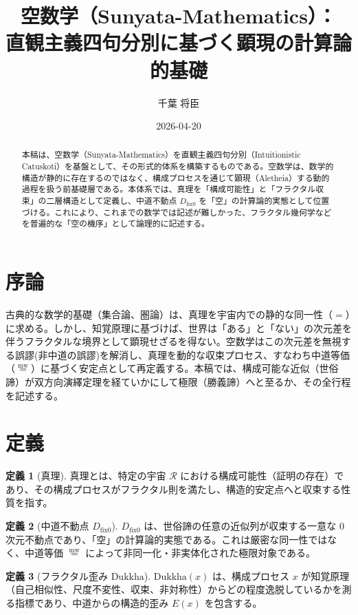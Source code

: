 \documentclass[11pt,a4paper]{article}
\newcommand{\mweq}{\mathrel{\overset{\mathrm{mw}}{=}}}
\newcommand{\dfix}{D_{\mathrm{fix}0}}
\newcommand{\Dukkha}{\mathrm{Dukkha}}
\newcommand{\Rep}{\mathcal{R}}
\theoremstyle{definition}
\newtheorem{definition}{定義}[section]
\begin{document}
\title{空数学（Sunyata-Mathematics）：\\ 直観主義四句分別に基づく顕現の計算論的基礎}
\author{千葉 将臣}
\date{2026-04-20}
\maketitle

\begin{abstract}
  本稿は、空数学（Sunyata-Mathematics）を直観主義四句分別（Intuitionistic Catuskoti）を基盤として、その形式的体系を構築するものである。空数学は、数学的構造が静的に存在するのではなく、構成プロセスを通じて顕現（Aletheia）する動的過程を扱う前基礎層である。本体系では、真理を「構成可能性」と「フラクタル収束」の二層構造として定義し、中道不動点 $\dfix$ を「空」の計算論的実態として位置づける。これにより、これまでの数学では記述が難しかった、フラクタル幾何学などを普遍的な「空の機序」として論理的に記述する。
\end{abstract}

\section{序論}
古典的な数学的基礎（集合論、圏論）は、真理を宇宙内での静的な同一性（$=$）に求める。しかし、知覚原理に基づけば、世界は「ある」と「ない」の次元差を伴うフラクタルな境界として顕現せざるを得ない。空数学はこの次元差を無視する誤謬(非中道の誤謬)を解消し、真理を動的な収束プロセス、すなわち中道等価（$\mweq$）に基づく安定点として再定義する。本稿では、構成可能な近似（世俗諦）が双方向演繹定理を経ていかにして極限（勝義諦）へと至るか、その全行程を記述する。

\section{定義}

\begin{definition}[真理]
真理とは、特定の宇宙 $\Rep$ における構成可能性（証明の存在）であり、その構成プロセスがフラクタル則を満たし、構造的安定点へと収束する性質を指す。
\end{definition}

\begin{definition}[中道不動点 $\dfix$]
$\dfix$ は、世俗諦の任意の近似列が収束する一意な $0$ 次元不動点であり、「空」の計算論的実態である。これは厳密な同一性ではなく、中道等価 $\mweq$ によって非同一化・非実体化された極限対象である。
\end{definition}

\begin{definition}[フラクタル歪み $\Dukkha$]
$\Dukkha(x)$ は、構成プロセス $x$ が知覚原理（自己相似性、尺度不変性、収束、非対称性）からどの程度逸脱しているかを測る指標であり、中道からの構造的歪み $E(x)$ を包含する。
\end{definition}
\end{document}
